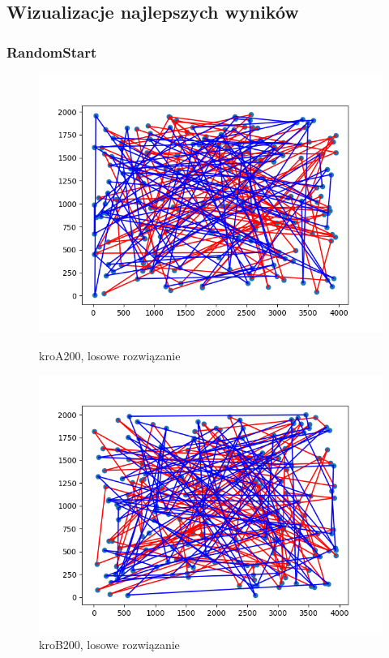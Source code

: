 \documentclass[11pt]{article}
\begin{document}
\subsection{Wizualizacje najlepszych wyników}\label{subsec:wizualizacje}


\subsubsection{RandomStart}
\begin{figure}[H]
    \begin{minipage}[t]{0.45\textwidth}
        \centering
        \includegraphics[width=\linewidth]{best_paths_constructions/kroA200/randomstart}
        \caption{kroA200, losowe rozwiązanie}
    \end{minipage}
    \hfill
    \begin{minipage}[t]{0.45\textwidth}
        \centering
        \includegraphics[width=\linewidth]{best_paths_constructions/kroB200/randomstart}
        \caption{kroB200, losowe rozwiązanie}
    \end{minipage}\label{fig:figure33}
\end{figure}
\end{document}
